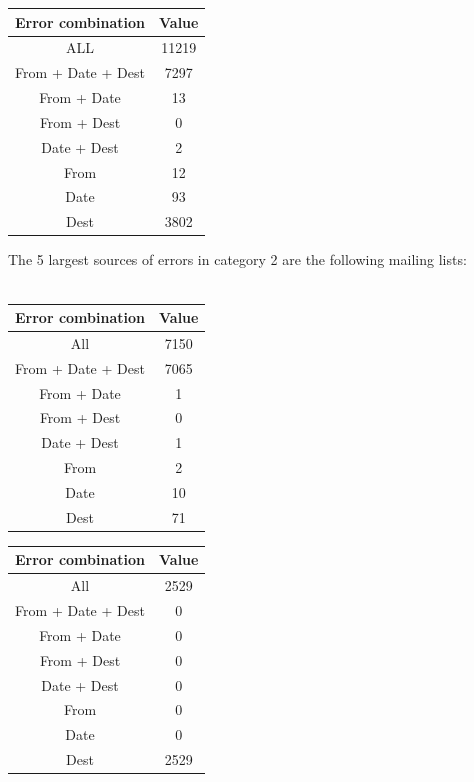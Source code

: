 \documentclass[a4paper,english]{report}
\begin{document}
\begin{center}

 \begin{tabular}{|c | c|}
 \hline
 Error combination & Value \\ [0.5ex]
 \hline\hline
ALL & 11219\\
\hline
From + Date + Dest & 7297\\
\hline
From + Date & 13\\
\hline
From + Dest & 0\\
\hline
Date + Dest & 2\\
\hline
From & 12\\
\hline
Date & 93\\
\hline
Dest & 3802\\
\hline

\end{tabular}
\end{center}



The 5 largest sources of errors in category 2 are the following mailing lists: \\\\
\noindent
\begin{center}
 \begin{tabular}{|c | c|}
 \hline
Error combination & Value \\ [0.5ex]
 \hline\hline
All & 7150\\
\hline
From + Date + Dest & 7065\\
\hline
From + Date & 1\\
\hline
From + Dest & 0\\
\hline
Date + Dest & 1\\
\hline
From & 2\\
\hline
Date & 10\\
\hline
Dest & 71\\
\hline
\end{tabular}
\end{center}

\bigskip

\begin{center}
 \begin{tabular}{|c | c|}
 \hline
Error combination & Value \\ [0.5ex]
 \hline\hline
All & 2529\\
\hline
From + Date + Dest & 0\\
\hline
From + Date & 0\\
\hline
From + Dest & 0\\
\hline
Date + Dest & 0\\
\hline
From & 0\\
\hline
Date & 0\\
\hline
Dest & 2529\\
\hline
\end{tabular}
\end{center}
\end{document}
